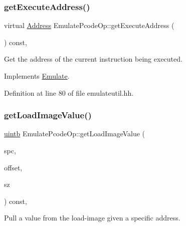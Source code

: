 \subsubsection{\texorpdfstring{getExecuteAddress()}{getExecuteAddress()}}
{\footnotesize\ttfamily virtual \mbox{\hyperlink{class_address}{Address}} Emulate\+Pcode\+Op\+::get\+Execute\+Address (\begin{DoxyParamCaption}\item[{void}]{ }\end{DoxyParamCaption}) const\hspace{0.3cm}{\ttfamily [inline]}, {\ttfamily [virtual]}}



Get the address of the current instruction being executed. 



Implements \mbox{\hyperlink{class_emulate_aeca3c773876b391304afffe2a5eff9de}{Emulate}}.



Definition at line 80 of file emulateutil.\+hh.

\mbox{\label{class_emulate_pcode_op_ad0820672a7c9f2a1a2457239f8d59378}} 
\subsubsection{\texorpdfstring{getLoadImageValue()}{getLoadImageValue()}}
{\footnotesize\ttfamily \mbox{\hyperlink{types_8h_a2db313c5d32a12b01d26ac9b3bca178f}{uintb}} Emulate\+Pcode\+Op\+::get\+Load\+Image\+Value (\begin{DoxyParamCaption}\item[{\mbox{\hyperlink{class_addr_space}{Addr\+Space}} $\ast$}]{spc,  }\item[{\mbox{\hyperlink{types_8h_a2db313c5d32a12b01d26ac9b3bca178f}{uintb}}}]{offset,  }\item[{int4}]{sz }\end{DoxyParamCaption}) const\hspace{0.3cm}{\ttfamily [protected]}, {\ttfamily [virtual]}}



Pull a value from the load-\/image given a specific address. 

